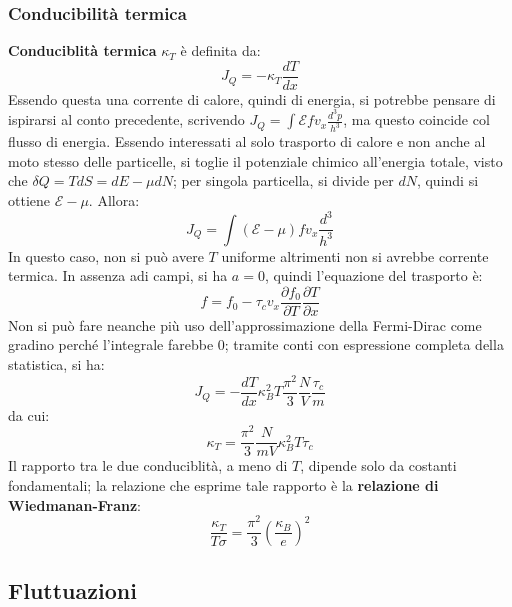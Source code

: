\documentclass[10pt, a4paper]{scrartcl}
\numberwithin{equation}{subsection}
\theoremstyle{style1}
\theoremstyle{style2}
\begin{document}
\subsubsection{Conducibilit\`a termica}
\textbf{Conduciblit\`a termica} $\kappa _T$ \`e definita da:
\begin{equation}
	J_Q = - \kappa _T \frac{d T}{d x} 
\end{equation}
Essendo questa una corrente di calore, quindi di energia, si potrebbe pensare di ispirarsi al conto precedente, scrivendo $J_Q = \int \mathscr{E} f v_x \frac{d^3 p}{h^3}$, ma questo coincide col flusso di energia.
Essendo interessati al solo trasporto di calore e non anche al moto stesso delle particelle, si toglie il potenziale chimico all'energia totale, visto che $\delta Q = T dS = dE -\mu dN$; per singola particella, si divide per $dN$, quindi si ottiene $\mathscr{E}-\mu $.
Allora:
\begin{equation}
	J_Q = \int (\mathscr{E} -\mu ) f v_x \frac{d^3 }{h^3}
\end{equation}
In questo caso, non si pu\`o avere $T $ uniforme altrimenti non si avrebbe corrente termica.
In assenza adi campi, si ha $a=0$, quindi l'equazione del trasporto \`e:
\begin{equation}
	f = f_0 - \tau _c v_x \frac{\partial f_0}{\partial T}  \frac{\partial T}{\partial x} 
\end{equation}
Non si pu\`o fare neanche pi\`u uso dell'approssimazione della Fermi-Dirac come gradino perch\'e l'integrale farebbe $0$;
tramite conti con espressione completa della statistica, si ha:
\begin{equation}
	J_Q = -\frac{d T}{d x} \kappa _B ^2 T \frac{\pi^2}{3}\frac{N}{V}\frac{\tau _c}{m}
\end{equation}
da cui:
\begin{equation}
	\kappa _T = \frac{\pi^2}{3} \frac{N}{mV}\kappa _B ^2 T \tau _c
\end{equation}
Il rapporto tra le due conduciblit\`a, a meno di $T$, dipende solo da costanti fondamentali;
la relazione che esprime tale rapporto \`e la \textbf{relazione di Wiedmanan-Franz}:
\begin{equation}
	\frac{\kappa _T}{T \sigma } = \frac{\pi^2}{3} \left(\frac{\kappa _B}{e}\right) ^2
\end{equation}

\subsection{Fluttuazioni}
\end{document}
